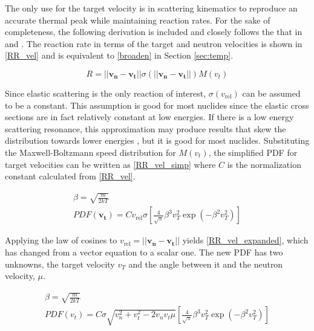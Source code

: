 The only use for the target velocity is in scattering kinematics to reproduce an accurate thermal peak while maintaining reaction rates.  For the sake of completeness, the following derivation is included and closely follows the that in \cite{openmc} and \cite{gelbard}.  The reaction rate in terms of the target and neutron velocities is shown in \eqref{RR_vel} and is equivalent to \eqref{broaden} in Section \ref{sec:temp}.

\begin{equation}
\label{RR_vel}
R = ||\boldsymbol{v_n}-\boldsymbol{v_t}|| \sigma(||\boldsymbol{v_n}-\boldsymbol{v_t}||) M(v_t)
\end{equation}

Since elastic scattering is the only reaction of interest, $\sigma(v_\mathrm{rel})$ can be assumed to be a constant.  This assumption is good for most nuclides since the elastic cross sections are in fact relatively constant at low energies.  If there is a low energy scattering resonance, this approximation may produce results that skew the distribution towards lower energies \cite{openmc}, but it is good for most nuclides.  Substituting the Maxwell-Boltzmann speed distribution for $M(v_t)$, the simplified PDF for target velocities can be written as \eqref{RR_vel_simp} where $C$ is the normalization constant calculated from \eqref{RR_vel}.

\begin{equation}
\label{RR_vel_simp}
\begin{gathered}
\beta = \sqrt{\frac{m}{2kT}} \\
PDF(\boldsymbol{v_t}) = C v_\mathrm{rel} \sigma \left[   \frac{4}{\sqrt{\pi}} \beta^3 v_T^2  \exp (- \beta^2  v_T^2 )      \right]
\end{gathered}
\end{equation}

Applying the law of cosines to $v_\mathrm{rel} = ||\boldsymbol{v_n}-\boldsymbol{v_t}||$ yields \eqref{RR_vel_expanded}, which has changed from a vector equation to a scalar one.   The new PDF has two unknowns, the target velocity $v_T$ and the angle between it and the neutron velocity, $\mu$.

\begin{equation}
\label{RR_vel_expanded}
\begin{gathered}
\beta = \sqrt{\frac{m}{2kT}} \\
PDF(v_t) = C \sigma  \sqrt{v_n^2+v_t^2-2 v_n v_t \mu} \left[   \frac{4}{\sqrt{\pi}} \beta^3 v_T^2  \exp ( -\beta^2  v_T^2 )      \right]
\end{gathered}
\end{equation}

